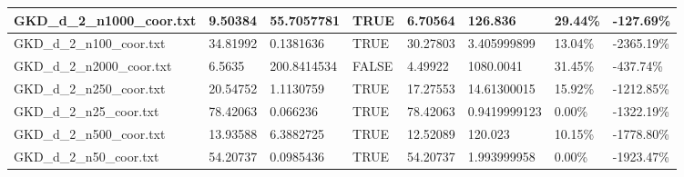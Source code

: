 \documentclass[preprint,12pt]{elsarticle}
\begin{document}
\begin{landscape}
\begin{table}[!ht]
\begin{tabular}{|l|l|l|l|l|l|l|l|}
        GKD\_d\_2\_n1000\_coor.txt & 9.50384 & 55.7057781 & TRUE & 6.70564 & 126.836 & 29.44\% & -127.69\% \\ \hline
        GKD\_d\_2\_n100\_coor.txt & 34.81992 & 0.1381636 & TRUE & 30.27803 & 3.405999899 & 13.04\% & -2365.19\% \\ \hline
        GKD\_d\_2\_n2000\_coor.txt & 6.5635 & 200.8414534 & FALSE & 4.49922 & 1080.0041 & 31.45\% & -437.74\% \\ \hline
        GKD\_d\_2\_n250\_coor.txt & 20.54752 & 1.1130759 & TRUE & 17.27553 & 14.61300015 & 15.92\% & -1212.85\% \\ \hline
        GKD\_d\_2\_n25\_coor.txt & 78.42063 & 0.066236 & TRUE & 78.42063 & 0.9419999123 & 0.00\% & -1322.19\% \\ \hline
        GKD\_d\_2\_n500\_coor.txt & 13.93588 & 6.3882725 & TRUE & 12.52089 & 120.023 & 10.15\% & -1778.80\% \\ \hline
        GKD\_d\_2\_n50\_coor.txt & 54.20737 & 0.0985436 & TRUE & 54.20737 & 1.993999958 & 0.00\% & -1923.47\% \\ \hline
    \end{tabular}
\end{table}
\end{landscape}
\end{document}
